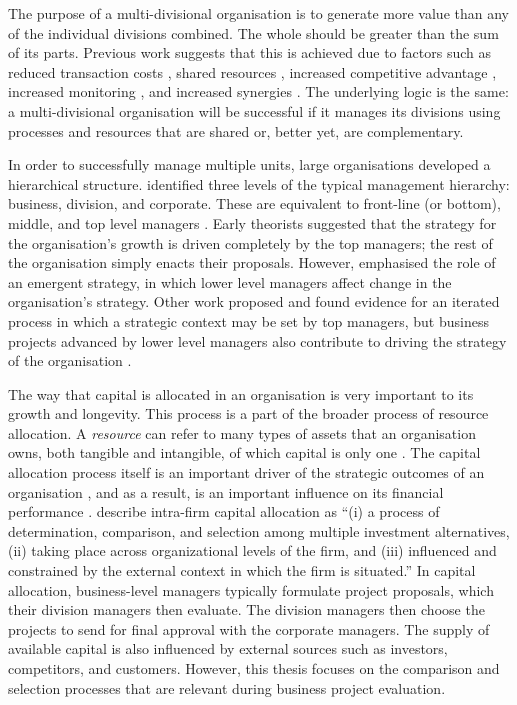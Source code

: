 \documentclass[a4paper, nobind, dvipsnames]{templates/ociamthesis}
\theoremstyle{definition}
\theoremstyle{definition}
\theoremstyle{definition}
\theoremstyle{definition}
\theoremstyle{remark}
\begin{document}
The purpose of a multi-divisional organisation is to generate more value than
any of the individual divisions combined. The whole should be greater than the
sum of its parts. Previous work suggests that this is achieved due to factors
such as reduced transaction costs \autocite{williamson1981,teece1982,teece1980,coase1937,liebeskind2000}, shared resources \autocite{wernerfelt1984,barney1991},
increased competitive advantage \autocite{porter1980,porter1985}, increased monitoring
\autocite{gertner1994}, and increased synergies \autocite{barney1988}. The underlying logic is
the same: a multi-divisional organisation will be successful if it manages its
divisions using processes and resources that are shared or, better yet, are
complementary.

In order to successfully manage multiple units, large organisations developed a
hierarchical structure. \textcite{bower1970} identified three levels of the typical
management hierarchy: business, division, and corporate. These are equivalent to
front-line (or bottom), middle, and top level managers \autocite{noda1996}. Early
theorists suggested that the strategy for the organisation's growth is driven
completely by the top managers; the rest of the organisation simply enacts their
proposals. However, \textcite{mintzberg1985} emphasised the role of an emergent strategy,
in which lower level managers affect change in the organisation's strategy.
Other work proposed and found evidence for an iterated process in which a
strategic context may be set by top managers, but business projects advanced by
lower level managers also contribute to driving the strategy of the organisation
\autocite{noda1996,burgelman1983,bower1970}.

The way that capital is allocated in an organisation is very important to its
growth and longevity. This process is a part of the broader process of resource
allocation. A \emph{resource} can refer to many types of assets that an organisation
owns, both tangible and intangible, of which capital is only one
\autocite{wernerfelt1984}. The capital allocation process itself is an important driver
of the strategic outcomes of an organisation \autocite{bower1970,bower2005}, and as a
result, is an important influence on its financial performance \autocites[e.g.,][]{arrfelt2015,bardolet2010}. \textcite[p.~72]{sengul2019} describe intra-firm capital
allocation as ``(i) a process of determination, comparison, and selection among
multiple investment alternatives, (ii) taking place across organizational levels
of the firm, and (iii) influenced and constrained by the external context in
which the firm is situated.'' In capital allocation, business-level managers
typically formulate project proposals, which their division managers then
evaluate. The division managers then choose the projects to send for final
approval with the corporate managers. The supply of available capital is also
influenced by external sources such as investors, competitors, and customers.
However, this thesis focuses on the comparison and selection processes that are
relevant during business project evaluation.
\end{document}
